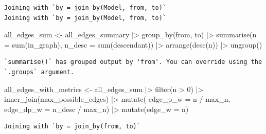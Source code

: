 \documentclass[
  letterpaper,
  DIV=11,
  numbers=noendperiod]{scrartcl}
\newenvironment{Shaded}{\begin{snugshade}}{\end{snugshade}}
\newcommand{\AttributeTok}[1]{\textcolor[rgb]{0.40,0.45,0.13}{#1}}
\newcommand{\DecValTok}[1]{\textcolor[rgb]{0.68,0.00,0.00}{#1}}
\newcommand{\FunctionTok}[1]{\textcolor[rgb]{0.28,0.35,0.67}{#1}}
\newcommand{\NormalTok}[1]{\textcolor[rgb]{0.00,0.23,0.31}{#1}}
\newcommand{\OtherTok}[1]{\textcolor[rgb]{0.00,0.23,0.31}{#1}}
\newcommand{\SpecialCharTok}[1]{\textcolor[rgb]{0.37,0.37,0.37}{#1}}
\begin{document}
\begin{verbatim}
Joining with `by = join_by(Model, from, to)`
Joining with `by = join_by(Model, from, to)`
\end{verbatim}

\begin{Shaded}
\begin{Highlighting}[]
\NormalTok{all\_edges\_sum }\OtherTok{\textless{}{-}} 
\NormalTok{    all\_edges\_summary }\SpecialCharTok{|\textgreater{}}
    \FunctionTok{group\_by}\NormalTok{(from, to) }\SpecialCharTok{|\textgreater{}} 
    \FunctionTok{summarise}\NormalTok{(}\AttributeTok{n =} \FunctionTok{sum}\NormalTok{(in\_graph),}
              \AttributeTok{n\_desc =} \FunctionTok{sum}\NormalTok{(descendant)) }\SpecialCharTok{|\textgreater{}} 
    \FunctionTok{arrange}\NormalTok{(}\FunctionTok{desc}\NormalTok{(n)) }\SpecialCharTok{|\textgreater{}} 
    \FunctionTok{ungroup}\NormalTok{()}
\end{Highlighting}
\end{Shaded}

\begin{verbatim}
`summarise()` has grouped output by 'from'. You can override using the
`.groups` argument.
\end{verbatim}

\begin{Shaded}
\begin{Highlighting}[]
\NormalTok{all\_edges\_with\_metrics }\OtherTok{\textless{}{-}} 
\NormalTok{    all\_edges\_sum }\SpecialCharTok{|\textgreater{}} 
    \FunctionTok{filter}\NormalTok{(n }\SpecialCharTok{\textgreater{}} \DecValTok{0}\NormalTok{) }\SpecialCharTok{|\textgreater{}} 
    \FunctionTok{inner\_join}\NormalTok{(max\_possible\_edges) }\SpecialCharTok{|\textgreater{}} 
    \FunctionTok{mutate}\NormalTok{(}
        \AttributeTok{edge\_p\_w =}\NormalTok{ n }\SpecialCharTok{/}\NormalTok{ max\_n,}
        \AttributeTok{edge\_dp\_w =}\NormalTok{ n\_desc }\SpecialCharTok{/}\NormalTok{ max\_n) }\SpecialCharTok{|\textgreater{}} 
    \FunctionTok{mutate}\NormalTok{(}\AttributeTok{edge\_w =}\NormalTok{ n)}
\end{Highlighting}
\end{Shaded}

\begin{verbatim}
Joining with `by = join_by(from, to)`
\end{verbatim}
\end{document}
